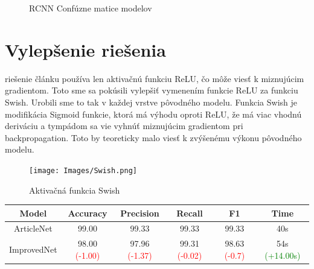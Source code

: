 \documentclass[journal,onecolumn]{IEEEtran}
\begin{document}
\begin{figure}[!htb]
    \centering
    \caption{RCNN Confúzne matice modelov}
    \label{fig:foobar}
\end{figure}

\section{Vylepšenie riešenia}
 riešenie článku používa len aktivačnú funkciu ReLU, čo môže viesť k miznujúcim gradientom. Toto sme sa pokúsili vylepšiť vymenením funkcie ReLU za funkciu Swish. Urobili sme to tak v každej vrstve pôvodného modelu. Funkcia Swish je modifikácia Sigmoid funkcie, ktorá má výhodu oproti ReLU, že má viac vhodnú deriváciu a tympádom sa vie vyhnúť miznujúcim gradientom pri backpropagation. Toto by teoreticky malo viesť k zvýšenému výkonu pôvodného modelu.  

\begin{figure}[!htb]
    \centering
    \texttt{[image: Images/Swish.png]}
    \caption{Aktivačná funkcia Swish \cite{swish}}
    \label{fig:enter-label}
\end{figure}

\vspace{10pt}

\begin{center}
{\renewcommand{\arraystretch}{1.5}
\begin{tabular}{|c|ccccc}
\hline
Model & Accuracy & Precision & Recall & F1 & Time \\                            
\hline          

ArticleNet & 
99.00  & 
99.33  & 
99.33  & 
99.33  & 
40s \\

ImprovedNet & 
98.00 \textcolor{red}{(-1.00)} & 
97.96 \textcolor{red}{(-1.37)} & 
99.31 \textcolor{red}{(-0.02)} & 
98.63 \textcolor{red}{(-0.7)} & 
54s \textcolor{green}{(+14.00s)} \\

\end{tabular}}
\end{center}
\end{document}
